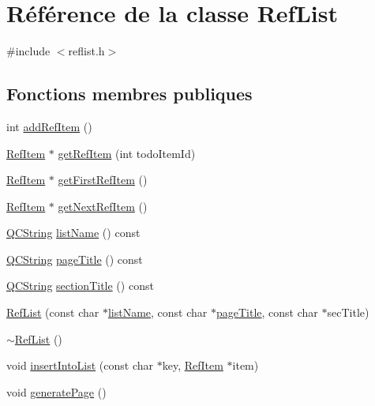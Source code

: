 \hypertarget{class_ref_list}{}\section{Référence de la classe Ref\+List}
\label{class_ref_list}


{\ttfamily \#include $<$reflist.\+h$>$}

\subsection*{Fonctions membres publiques}
\begin{DoxyCompactItemize}
\item 
int \hyperlink{class_ref_list_ae3dccd8cef3a09ed34c6fb611766875b}{add\+Ref\+Item} ()
\item 
\hyperlink{struct_ref_item}{Ref\+Item} $\ast$ \hyperlink{class_ref_list_af047154431d78b27f413e14cadc1d15e}{get\+Ref\+Item} (int todo\+Item\+Id)
\item 
\hyperlink{struct_ref_item}{Ref\+Item} $\ast$ \hyperlink{class_ref_list_a065a043b7798849b1b97734b39ff3e85}{get\+First\+Ref\+Item} ()
\item 
\hyperlink{struct_ref_item}{Ref\+Item} $\ast$ \hyperlink{class_ref_list_a29659cc06bbde1e0b3a2b968ae333927}{get\+Next\+Ref\+Item} ()
\item 
\hyperlink{class_q_c_string}{Q\+C\+String} \hyperlink{class_ref_list_a2ab3866977ce58fab559d6f03d7a5d4c}{list\+Name} () const 
\item 
\hyperlink{class_q_c_string}{Q\+C\+String} \hyperlink{class_ref_list_a03cb43018d1d4c530efdf823fb001a74}{page\+Title} () const 
\item 
\hyperlink{class_q_c_string}{Q\+C\+String} \hyperlink{class_ref_list_a1117ef561ab6571432c676ce57d6d49c}{section\+Title} () const 
\item 
\hyperlink{class_ref_list_a53383174c5d9adbffbfaf6b7680b5d34}{Ref\+List} (const char $\ast$\hyperlink{class_ref_list_a2ab3866977ce58fab559d6f03d7a5d4c}{list\+Name}, const char $\ast$\hyperlink{class_ref_list_a03cb43018d1d4c530efdf823fb001a74}{page\+Title}, const char $\ast$sec\+Title)
\item 
\hyperlink{class_ref_list_a24ed19af8e396ebb4c196ab7a6805901}{$\sim$\+Ref\+List} ()
\item 
void \hyperlink{class_ref_list_ab6dc34e95c0e8c36a07fe57de27fc6dd}{insert\+Into\+List} (const char $\ast$key, \hyperlink{struct_ref_item}{Ref\+Item} $\ast$item)
\item 
void \hyperlink{class_ref_list_a1fb6f991a5826241faab676ba08fb5e3}{generate\+Page} ()
\end{DoxyCompactItemize}


